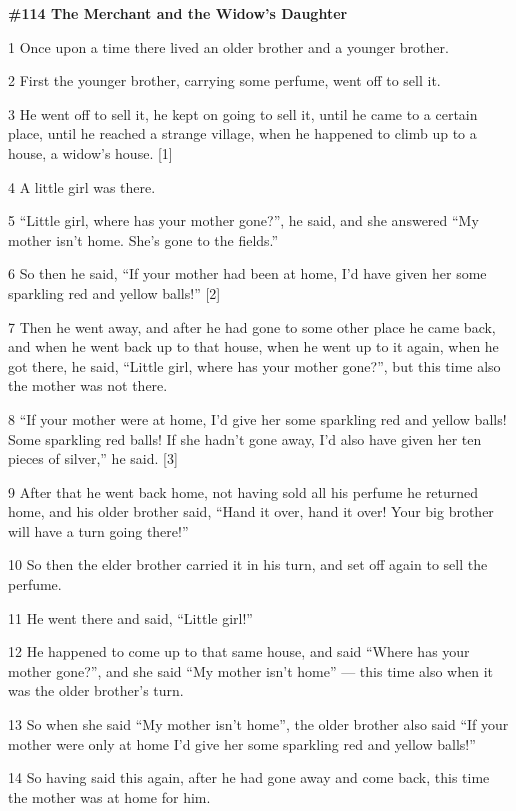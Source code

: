 
{\LARGE{}\textbf{\#114 The Merchant and the Widow's Daughter}}

{\LARGE{}1 Once upon a time there lived an older brother and a younger brother.}

{\LARGE{}2 First the younger brother, carrying some perfume, went off to sell it.}

{\LARGE{}3 He went off to sell it, he kept on going to sell it, until he came to
a certain place, until he reached a strange village, when he happened to climb
up to a house, a widow's house. [1]}

{\LARGE{}4 A little girl was there.}

{\LARGE{}5 ``Little girl, where has your mother gone?'', he said, and she answered
``My mother isn't home. She's gone to the fields.''}

{\LARGE{}6 So then he said, ``If your mother had been at home, I'd have given her
some sparkling red and yellow balls!'' [2]}

{\LARGE{}7 Then he went away, and after he had gone to some other place he came
back, and when he went back up to that house, when he went up to it again, when
he got there, he said, ``Little girl, where has your mother gone?'', but this time
also the mother was not there.}

{\LARGE{}8 ``If your mother were at home, I'd give her some sparkling red and yellow
balls! Some sparkling red balls! If she hadn't gone away, I'd also have given her
ten pieces of silver,'' he said. [3]}

{\LARGE{}9 After that he went back home, not having sold all his perfume he returned
home, and his older brother said, ``Hand it over, hand it over! Your big brother
will have a turn going there!''}

{\LARGE{}10 So then the elder brother carried it in his turn, and set off again
to sell the perfume.}

{\LARGE{}11 He went there and said, ``Little girl!''}

{\LARGE{}12 He happened to come up to that same house, and said ``Where has your
mother gone?'', and she said ``My mother isn't home'' --- this time also when it
was the older brother's turn.}

{\LARGE{}13 So when she said ``My mother isn't home'', the older brother also said
``If your mother were only at home I'd give her some sparkling red and yellow balls!''}

{\LARGE{}14 So having said this again, after he had gone away and come back, this
time the mother was at home for him.}

